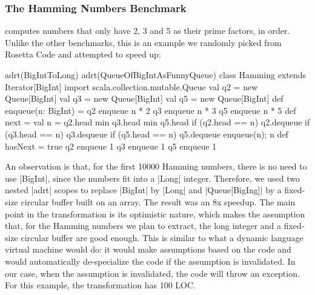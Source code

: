 \subsubsection{The Hamming Numbers Benchmark} computes numbers that only have 2, 3 and 5 as their prime factors, in order. Unlike the other benchmarks, this is an example we randomly picked from Rosetta Code \cite{rosetta-code} and attempted to speed up:

\begin{lstlisting-nobreak}
adrt(BigIntToLong) {
  adrt(QueueOfBigIntAsFunnyQueue) {
    class Hamming extends Iterator[BigInt] {
      import scala.collection.mutable.Queue
      val q2 = new Queue[BigInt]
      val q3 = new Queue[BigInt]
      val q5 = new Queue[BigInt]
      def enqueue(n: BigInt) = {
        q2 enqueue n * 2
        q3 enqueue n * 3
        q5 enqueue n * 5
      }
      def next = {
        val n = q2.head min q3.head min q5.head
        if (q2.head == n) q2.dequeue
        if (q3.head == n) q3.dequeue
        if (q5.head == n) q5.dequeue
        enqueue(n); n
      }
      def hasNext = true
      q2 enqueue 1
      q3 enqueue 1
      q5 enqueue 1
    }
  }
}
\end{lstlisting-nobreak}

An observation is that, for the first 10000 Hamming numbers, there is no need to use |BigInt|, since the numbers fit into a |Long| integer. Therefore, we used two nested |adrt| scopes to replace |BigInt| by |Long| and |Queue[BigIng]| by a fixed-size circular buffer built on an array. The result was an 8x speedup. The main point in the transformation is its optimistic nature, which makes the assumption that, for the Hamming numbers we plan to extract, the long integer and a fixed-size circular buffer are good enough. This is similar to what a dynamic language virtual machine would do: it would make assumptions based on the code and would automatically de-specialize the code if the assumption is invalidated. In our case, when the assumption is invalidated, the code will throw an exception. For this example, the transformation has 100 LOC.



